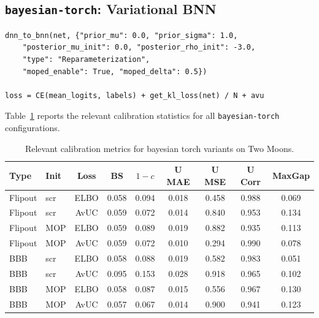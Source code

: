 \documentclass[conference]{IEEEtran}
\begin{document}
\subsection{\texttt{bayesian-torch}: Variational BNN}
\label{sec:bnn}

\begin{lstlisting}[caption={BNN conversion and ELBO AvUC training.}]
dnn_to_bnn(net, {"prior_mu": 0.0, "prior_sigma": 1.0,
    "posterior_mu_init": 0.0, "posterior_rho_init": -3.0,
    "type": "Reparameterization",
    "moped_enable": True, "moped_delta": 0.5})

loss = CE(mean_logits, labels) + get_kl_loss(net) / N + avu
\end{lstlisting}

Table~\ref{tab:bnn_main_subset} reports the relevant calibration statistics for all \texttt{bayesian-torch} configurations.

\begin{table}[H]
	\centering
	\caption{Relevant calibration metrics for bayesian torch variants on Two Moons.}
	\label{tab:bnn_main_subset}
	\small\setlength{\tabcolsep}{4pt}
	\begin{tabular}{llccccccc}
		\toprule
		Type    & Init & Loss & BS    & $1 - c$ & U MAE & U MSE & U Corr & MaxGap \\
		\midrule
		Flipout & scr  & ELBO & 0.058 & 0.094   & 0.018 & 0.458 & 0.988  & 0.069  \\
		Flipout & scr  & AvUC & 0.059 & 0.072   & 0.014 & 0.840 & 0.953  & 0.134  \\
		Flipout & MOP  & ELBO & 0.059 & 0.089   & 0.019 & 0.882 & 0.935  & 0.113  \\
		Flipout & MOP  & AvUC & 0.059 & 0.072   & 0.010 & 0.294 & 0.990  & 0.078  \\
		BBB     & scr  & ELBO & 0.058 & 0.088   & 0.019 & 0.582 & 0.983  & 0.051  \\
		BBB     & scr  & AvUC & 0.095 & 0.153   & 0.028 & 0.918 & 0.965  & 0.102  \\
		BBB     & MOP  & ELBO & 0.058 & 0.087   & 0.015 & 0.556 & 0.967  & 0.130  \\
		BBB     & MOP  & AvUC & 0.057 & 0.067   & 0.014 & 0.900 & 0.941  & 0.123  \\
		\bottomrule
	\end{tabular}
\end{table}
\end{document}
